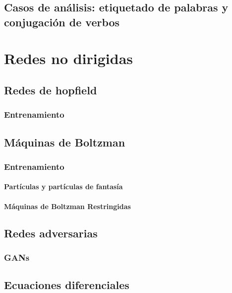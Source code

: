 \documentclass[12pt,openany]{book}
\begin{document}
\chapter{Casos de análisis: etiquetado de palabras y conjugación de verbos}

\part{Redes no dirigidas}
\chapter{Redes de hopfield}
\section{Entrenamiento}

\chapter{Máquinas de Boltzman}
\section{Entrenamiento}
\subsection{Partículas y partículas de fantasía}
\subsection{Máquinas de Boltzman Restringidas}

\chapter{Redes adversarias}
\section{GANs}

\appendix 
\chapter{Ecuaciones diferenciales}

\backmatter

\printbibliography[heading=bibintoc]
\end{document}
